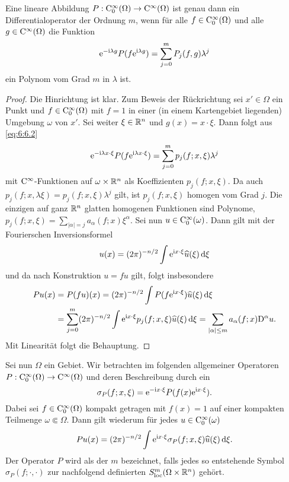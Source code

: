 \begin{lem}
Eine  lineare Abbildung   $P:\mathrm C_0^\infty(\Omega)\to\mathrm C^\infty(\Omega)$ ist genau dann ein Differentialoperator der Ordnung $m$, wenn für alle $f\in\mathrm C_0^\infty(\Omega)$ und alle $g\in\mathrm C^\infty(\Omega)$ die Funktion 
\begin{equation}\label{eq:6:6.2}
\mathrm e^{-\mathrm i\lambda g} P(f\mathrm e^{\mathrm i\lambda g}) = \sum_{j=0}^m P_j(f,g) \lambda^j
\end{equation}
ein Polynom vom Grad $m$ in $\lambda$ ist.
\end{lem}
\begin{proof}
Die Hinrichtung ist klar. Zum Beweis der Rückrichtung sei $x'\in\Omega$ ein Punkt und $f\in\mathrm C_0^\infty(\Omega)$ mit $f=1$  in einer (in einem Kartengebiet liegenden) Umgebung $\omega$ von $x'$. Sei weiter $\xi\in\mathbb R^n$ und $g(x) = x\cdot\xi$. Dann folgt aus \eqref{eq:6:6.2}
\begin{equation}
    \mathrm e^{-\mathrm i \lambda x\cdot\xi} P ( f\mathrm e^{\mathrm i \lambda x\cdot\xi}) = \sum_{j=0}^m p_j(f;x,\xi) \lambda^j
\end{equation}
mit $\mathrm C^\infty$-Funktionen auf $\omega\times\mathbb R^n$ als Koeffizienten $p_j(f;x,\xi)$. Da auch
$p_j(f;x,\lambda\xi)=p_j(f;x,\xi)\lambda^j$ gilt, ist $p_j(f;x,\xi)$ homogen vom Grad $j$. Die einzigen auf ganz $\mathbb R^n$ glatten homogenen Funktionen sind Polynome,
$p_j(f;x,\xi) = \sum_{|\alpha|=j} a_\alpha(f;x) \xi^\alpha$. Sei nun $u\in\mathrm C_0^\infty(\omega)$. Dann gilt mit der Fourierschen Inversionsformel
\begin{equation}
    u(x) = (2\pi)^{-n/2} \int \mathrm e^{\mathrm i x\cdot\xi} \widehat u(\xi)\,\mathrm d\xi
\end{equation}
und da nach Konstruktion $u=fu$ gilt, folgt insbesondere 
\begin{align}
    Pu(x) &= P(fu)(x) = (2\pi)^{-n/2} \int P(f \mathrm e^{\mathrm i x\cdot\xi}) \widehat u(\xi)\,\mathrm d\xi \notag \\&= \sum_{j=0}^m (2\pi)^{-n/2} \int \mathrm e^{\mathrm i x\cdot\xi} p_j(f;x,\xi) \widehat u(\xi)\,\mathrm d\xi
    = \sum_{|\alpha|\le m} a_\alpha(f;x)\mathrm D^\alpha u.
\end{align}
Mit Linearität folgt die Behauptung.
\end{proof}

Sei nun $\Omega$ ein Gebiet.
Wir betrachten im folgenden allgemeiner Operatoren $P : \mathrm C_0^\infty(\Omega) \to \mathrm C^\infty(\Omega)$ und deren Beschreibung durch ein 
\begin{equation}\label{eq:6:6.6}
    \sigma_P(f; x,\xi) = \mathrm e^{-\mathrm i x\cdot\xi} P( f(x) \mathrm e^{\mathrm i x\cdot\xi}).
\end{equation}  
Dabei sei $f\in\mathrm C_0^\infty(\Omega)$ kompakt getragen mit $f(x)=1$ auf einer kompakten Teilmenge $\omega\Subset\Omega$. 
Dann gilt wiederum für jedes $u\in\mathrm C_0^\infty(\omega)$ 
\begin{equation}
   P u (x) = (2\pi)^{-n/2} \int \mathrm e^{\mathrm i x\cdot\xi} \sigma_P(f; x,\xi) \widehat u(\xi) \,\mathrm d\xi.
\end{equation}
Der Operator $P$ wird als  der  $m$ bezeichnet, falls jedes so entstehende Symbol 
$\sigma_P(f;\cdot,\cdot)$ zur nachfolgend definierten  $S^m_{\rm loc}(\Omega\times\mathbb R^n)$ gehört.

